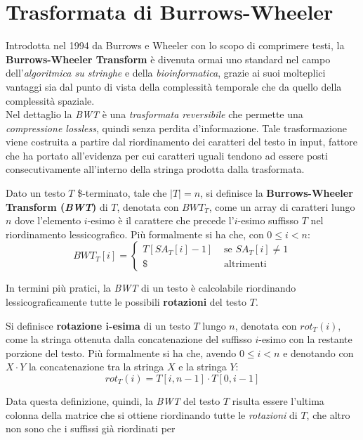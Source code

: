\section{Trasformata di Burrows-Wheeler}
\label{secbwt}
Introdotta nel 1994 da Burrows e Wheeler con lo scopo di comprimere testi, la
\textbf{Burrows-Wheeler Transform} \cite{bwt} è divenuta ormai uno standard nel
campo dell'\textit{algoritmica su stringhe} e della \textit{bioinformatica},
grazie ai suoi molteplici vantaggi sia dal punto di vista della complessità
temporale che da quello della complessità spaziale.\\
Nel dettaglio la \textit{BWT} è una \textit{trasformata reversibile} che
permette una \textit{compressione lossless}, quindi senza perdita
d'informazione. Tale trasformazione viene costruita a partire dal riordinamento
dei caratteri del testo in input, fattore che ha 
portato all'evidenza per cui caratteri uguali tendono ad essere posti
consecutivamente all'interno della stringa prodotta dalla trasformata.
\begin{definizione}
  Dato un testo $T$ \$-terminato, tale che $|T|=n$, si definisce la
  \textbf{Burrows-Wheeler Transform (\textit{BWT})} di $T$, denotata con
  $BWT_T$, come un array di caratteri lungo $n$ dove l'elemento $i$-esimo è il
  carattere che precede l'$i$-esimo suffisso $T$ nel riordinamento
  lessicografico. Più formalmente si ha che, con $0\leq i<n$:
  \[BWT_T[i]=
    \begin{cases}
      T[SA_T[i]-1]&\mbox{ se } SA_T[i]\neq 1\\
      \$&\mbox{ altrimenti}
    \end{cases}
  \]
\end{definizione}
In termini più pratici, la \textit{BWT} di un testo è calcolabile riordinando
lessicograficamente tutte le possibili \textbf{rotazioni} del testo $T$.
\begin{definizione}
  Si definisce \textbf{rotazione $\mathbf{i}$-esima} di
  un testo $T$ lungo $n$, denotata con $rot_T(i)$, come la stringa ottenuta
  dalla concatenazione 
  del suffisso $i$-esimo con la restante porzione del testo. Più formalmente si
  ha che, avendo $0\leq i<n$ e denotando con $X\cdot Y$ la concatenazione tra
  la stringa $X$ e la stringa $Y$:
  \[rot_T(i)=T[i,n-1]\cdot T[0,i-1]\]
\end{definizione}
Data questa definizione, quindi, la \textit{BWT} del testo $T$ risulta essere
l'ultima colonna della matrice che si ottiene riordinando tutte le
\textit{rotazioni} di $T$, che altro non sono che i suffissi già riordinati per
